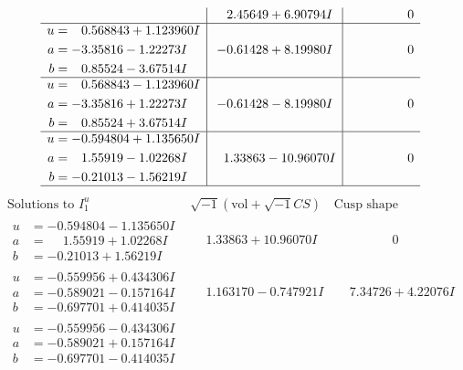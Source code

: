 \documentclass[1p]{elsarticle_modified}
\theoremstyle{definition}
\newcommand{\I}{\sqrt{-1}}
\begin{document}
$$\begin{array}{c|c|c}
 & \phantom{-}2.45649 + 6.90794 I & \phantom{-0.000000 } 0 \\ \hline\begin{aligned}
u &= \phantom{-}0.568843 + 1.123960 I \\
a &= -3.35816 - 1.22273 I \\
b &= \phantom{-}0.85524 - 3.67514 I\end{aligned}
 & -0.61428 + 8.19980 I & \phantom{-0.000000 } 0 \\ \hline\begin{aligned}
u &= \phantom{-}0.568843 - 1.123960 I \\
a &= -3.35816 + 1.22273 I \\
b &= \phantom{-}0.85524 + 3.67514 I\end{aligned}
 & -0.61428 - 8.19980 I & \phantom{-0.000000 } 0 \\ \hline\begin{aligned}
u &= -0.594804 + 1.135650 I \\
a &= \phantom{-}1.55919 - 1.02268 I \\
b &= -0.21013 - 1.56219 I\end{aligned}
 & \phantom{-}1.33863 - 10.96070 I & \phantom{-0.000000 } 0\\
 \hline 
 \end{array}$$\newpage$$\begin{array}{c|c|c}  
\text{Solutions to }I^u_{1}& \I (\text{vol} + \sqrt{-1}CS) & \text{Cusp shape}\\
 \hline 
\begin{aligned}
u &= -0.594804 - 1.135650 I \\
a &= \phantom{-}1.55919 + 1.02268 I \\
b &= -0.21013 + 1.56219 I\end{aligned}
 & \phantom{-}1.33863 + 10.96070 I & \phantom{-0.000000 } 0 \\ \hline\begin{aligned}
u &= -0.559956 + 0.434306 I \\
a &= -0.589021 - 0.157164 I \\
b &= -0.697701 + 0.414035 I\end{aligned}
 & \phantom{-}1.163170 - 0.747921 I & \phantom{-}7.34726 + 4.22076 I \\ \hline\begin{aligned}
u &= -0.559956 - 0.434306 I \\
a &= -0.589021 + 0.157164 I \\
b &= -0.697701 - 0.414035 I\end{aligned}

\end{array}$$
\end{document}
